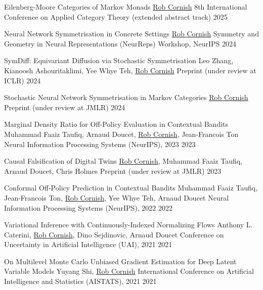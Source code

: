\documentclass[9pt]{developercv} %
\begin{document}
\begin{entrylist}
    \publication
        {Eilenberg-Moore Categories of Markov Monads}
        {\underline{Rob Cornish}}
        {8th International Conference on Applied Category Theory (extended abstract track)}
        {2025}

    \publication
        {Neural Network Symmetrisation in Concrete Settings}
        {\underline{Rob Cornish}}
        {Symmetry and Geometry in Neural Representations (NeurReps) Workshop, NeurIPS}
        {2024}

    \publication
        {SymDiff: Equivariant Diffusion via Stochastic Symmetrisation}
        {Leo Zhang, Kianoosh Ashouritaklimi, Yee Whye Teh, \underline{Rob Cornish}}
        {Preprint (under review at ICLR)}
        {2024}

    \publication
        {Stochastic Neural Network Symmetrisation in Markov Categories}
        {\underline{Rob Cornish}}
        {Preprint (under review at JMLR)}
        {2024}

    \publication
        {Marginal Density Ratio for Off-Policy Evaluation in Contextual Bandits}
        {Muhammad Faaiz Taufiq, Arnaud Doucet, \underline{Rob Cornish}, Jean-Francois Ton}
        {Neural Information Processing Systems (NeurIPS), 2023}
        {2023}

    \publication
        {Causal Falsification of Digital Twins}
        {\underline{Rob Cornish}, Muhammad Faaiz Taufiq, Arnaud Doucet, Chris Holmes}
        {Preprint (under review at JMLR)}
        {2023}

    \publication
        {Conformal Off-Policy Prediction in Contextual Bandits}
        {Muhammad Faaiz Taufiq, Jean-Francois Ton, \underline{Rob Cornish}, Yee Whye Teh, Arnaud Doucet}
        {Neural Information Processing Systems (NeurIPS), 2022}
        {2022}

    \publication
        {Variational Inference with Continuously-Indexed Normalizing Flows}
        {Anthony L. Caterini, \underline{Rob Cornish}, Dino Sejdinovic, Arnaud Doucet}
        {Conference on Uncertainty in Artificial Intelligence (UAI), 2021}
        {2021}

    \publication
        {On Multilevel Monte Carlo Unbiased Gradient Estimation for Deep Latent Variable Models}
        {Yuyang Shi, \underline{Rob Cornish}}
        {International Conference on Artificial Intelligence and Statistics (AISTATS), 2021}
        {2021}



\end{entrylist}
\end{document}

